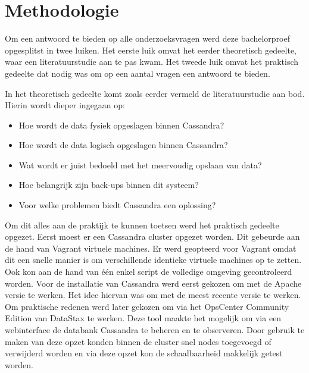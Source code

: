 \chapter{Methodologie}
\label{ch:methodologie}


Om een antwoord te bieden op alle onderzoeksvragen werd deze bachelorproef opgesplitst in twee luiken.
Het eerste luik omvat het eerder theoretisch gedeelte, waar een literatuurstudie aan te pas kwam.
Het tweede luik omvat het praktisch gedeelte dat nodig was om op een aantal vragen een antwoord te bieden.

In het theoretisch gedeelte komt zoals eerder vermeld de literatuurstudie aan bod.
Hierin wordt dieper ingegaan op: 
\begin{itemize} 
	\item Hoe wordt de data fysiek opgeslagen binnen Cassandra?
	\item Hoe wordt de data logisch opgeslagen binnen Cassandra?
	\item Wat wordt er juist bedoeld met het meervoudig opslaan van data?
	\item Hoe belangrijk zijn back-ups binnen dit systeem?
	\item Voor welke problemen biedt Cassandra een oplossing?
\end{itemize}

Om dit alles aan de praktijk te kunnen toetsen werd het praktisch gedeelte opgezet.
Eerst moest er een Cassandra cluster opgezet worden.
Dit gebeurde aan de hand van Vagrant virtuele machines.
Er werd geopteerd voor Vagrant omdat dit een snelle manier is om verschillende identieke virtuele machines op te zetten.
Ook kon aan de hand van één enkel script de volledige omgeving gecontroleerd worden.
Voor de installatie van Cassandra werd eerst gekozen om met de Apache versie te werken.
Het idee hiervan was om met de meest recente versie te werken.
Om praktische redenen werd later gekozen om via het OpsCenter Community Edition van DataStax te werken.
Deze tool maakte het mogelijk om via een webinterface de databank Cassandra te beheren en te observeren.
Door gebruik te maken van deze opzet konden binnen de cluster snel nodes toegevoegd of verwijderd worden en via deze opzet kon de schaalbaarheid makkelijk getest worden.

